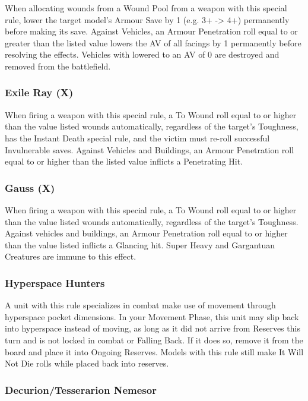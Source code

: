 When allocating wounds from a Wound Pool from a weapon with this special rule, lower the target model's Armour Save by 1 (e.g. 3+ -> 4+) permanently before making its save. Against Vehicles, an Armour Penetration roll equal to or greater than the listed value lowers the AV of all facings by 1 permanently before resolving the effects. Vehicles with lowered to an AV of 0 are destroyed and removed from the battlefield.


\subsubsection{Exile Ray (X)} \label{Exile Ray}

When firing a weapon with this special rule, a To Wound roll equal to or higher than the value listed wounds automatically, regardless of the target's Toughness, has the Instant Death special rule, and the victim must re-roll successful Invulnerable saves. Against Vehicles and Buildings, an Armour Penetration roll equal to or higher than the listed value inflicts a Penetrating Hit.

\subsubsection{Gauss (X)} \label{Gauss}

When firing a weapon with this special rule, a To Wound roll equal to or higher than the value listed wounds automatically, regardless of the target’s Toughness. Against vehicles and buildings, an Armour Penetration roll equal to or higher than the value listed inflicts a Glancing hit. Super Heavy and Gargantuan Creatures are immune to this effect.

\subsubsection{Hyperspace Hunters} \label{Hyperspace Hunters}

A unit with this rule specializes in combat make use of movement through hyperspace pocket dimensions. In your Movement Phase, this unit may slip back into hyperspace instead of moving, as long as it did not arrive from Reserves this turn and is not locked in combat or Falling Back. If it does so, remove it from the board and place it into Ongoing Reserves. Models with this rule still make It Will Not Die rolls while placed back into reserves.

\subsubsection{Decurion/Tesserarion Nemesor} \label{Decurion Nemesor} \label{Tesserarion Nemesor}

